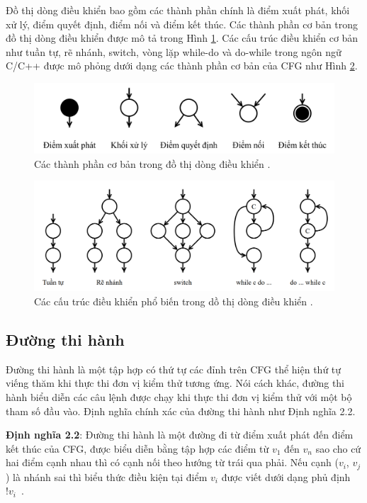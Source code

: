 Đồ thị dòng điều khiển bao gồm các thành phần chính là điểm xuất phát, khối xử lý, điểm quyết định, điểm nối và điểm kết thúc. Các thành phần cơ bản trong đồ thị dòng điều khiển được mô tả trong Hình \ref{fig:flow-element}. Các cấu trúc điều khiển cơ bản như tuần tự, rẽ nhánh, switch, vòng lặp while-do và do-while trong ngôn ngữ C/C++ được mô phỏng dưới dạng các thành phần cơ bản của CFG như Hình \ref{fig:flow-structure}.
\begin{figure}[h]
	\centering
	\includegraphics[width=\linewidth]{images/flow-element.png}
	\caption{Các thành phần cơ bản trong đồ thị dòng điều khiển \cite{GiaoTrinhKiemThu}.}
	\label{fig:flow-element}
\end{figure}

\begin{figure}[h]
	\centering
	\includegraphics[width=\linewidth]{images/flow-structure.png}
	\caption{Các cấu trúc điều khiển phổ biến trong dồ thị dòng điều khiển \cite{GiaoTrinhKiemThu}.}
	\label{fig:flow-structure}
\end{figure}

\subsection{Đường thi hành}\label{sec:path}
Đường thi hành là một tập hợp có thứ tự các đỉnh trên CFG thể hiện thứ tự viếng thăm khi thực thi đơn vị kiểm thử tương ứng. Nói cách khác, đường thi hành biểu diễn các câu lệnh được chạy khi thực thi đơn vị kiểm thử với một bộ tham số đầu vào. Định nghĩa chính xác của đường thi hành như Định nghĩa 2.2.

\textbf{Định nghĩa 2.2}: Đường thi hành là một đường đi từ điểm xuất phát đến điểm kết thúc của CFG, được biểu diễn bằng tập hợp các điểm từ $v_1$ đến $v_n$ sao cho cứ hai điểm cạnh nhau thì có cạnh nối theo hướng từ trái qua phải. Nếu cạnh ($v_i$, $v_j$) là nhánh sai thì biểu thức điều kiện tại điểm $v_i$ được viết dưới dạng phủ định $!v_i$~\cite{GiaoTrinhKiemThu}.


